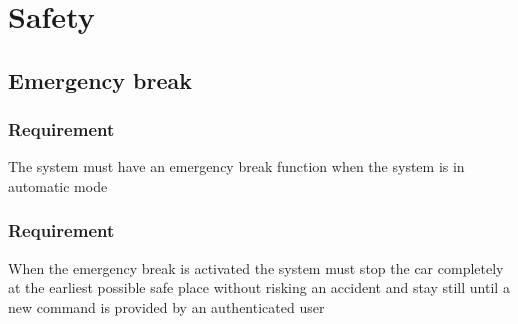 \documentclass{article}
\begin{document}

\section{Safety}
  \subsection{Emergency break}
      \subsubsection{Requirement}
\hfill \break 
\- \- \-The system must have an emergency break function when the system is in automatic mode
      \subsubsection{Requirement}
\hfill \break 
\- \- \-When the emergency break is activated the system must stop the car completely at the earliest possible safe place without risking an accident and stay still until a new command is provided by an authenticated user
\end{document}
